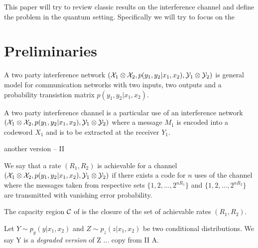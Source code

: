 \documentclass[aps,11pt,twoside,letterpaper]{revtex4}
\begin{document}
    This paper will try to review classic results on the interference channel and
    define the problem in the quantum setting.
    Specifically we will try to focus on the 
    
    
    
    
 \section{Preliminaries}

        \begin{definition}
            A two party interference network $({\cal X}_1 \otimes {\cal X}_2, p(y_1,y_2|x_1,x_2), {\cal Y}_1 \otimes {\cal Y}_2)$ 
            is general model for communication networks with two inputs, two outputs and a probability transistion
            matrix $p(y_1,y_2|x_1,x_2)$.
        \end{definition}
        
        

        \begin{definition}
            A two party interference channel is a particular use of an interference network 
            $({\cal X}_1 \otimes {\cal X}_2, p(y_1,y_2|x_1,x_2), {\cal Y}_1 \otimes {\cal Y}_2)$ 
            where a message $M_1$ is encoded into a codeword $X_1$ and is to be extracted at the receiver $Y_1$.
        \end{definition}

        another version -- II

        
        \begin{definition}
            We say that a rate $(R_1,R_2)$ is achievable for a channel $({\cal X}_1 \otimes {\cal X}_2, p(y_1,y_2|x_1,x_2), {\cal Y}_1 \otimes {\cal Y}_2)$
            if there exists a code for $n$ uses of the channel where the messages taken from respective sets $\{1,2,\ldots,2^{nR_1} \}$ and
             $\{1,2,\ldots,2^{nR_2} \}$ are transmitted with vanishing error probability.
        \end{definition}
        
        
        \begin{definition}[Capacity]
            The capacity region ${\cal C}$ of is the closure of the set of achievable rates $(R_1,R_2)$.
        \end{definition}


        \begin{definition}
            Let $Y \sim p_y(y|x_1,x_2)$ and $Z \sim p_z(z|x_1,x_2)$ be two conditional distributions.
            We say Y is a \emph{degraded version} of Z ...
            copy from \cite{Carleial83} II A.
        \end{definition}
\end{document}
